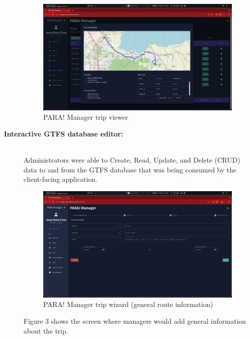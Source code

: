 \documentclass{icsthesis}
\begin{document}
\begin{mainmatter}
\begin{description}
		\begin{figure}[h]
			\centering
				\includegraphics[scale=0.18]{./figures/manager/view trip.jpeg}
			\caption{PARA! Manager trip viewer}
		\end{figure}

        \newpage
		
			\item[\textbf{Interactive GTFS database editor:}] \hfill \\
				Administrators were able to Create, Read, Update, and Delete (CRUD) data to and from the GTFS database that was being consumed by the client-facing application.
		
		\begin{figure}[!h]
			\centering
				\includegraphics[scale=0.18]{./figures/manager/trip wizard 1.jpeg}
			\caption{PARA! Manager trip wizard (general route information)}
		\end{figure}
		
		Figure 3 shows the screen where managers would add general information about the trip.
		

\end{description}
\end{mainmatter}
\end{document}
